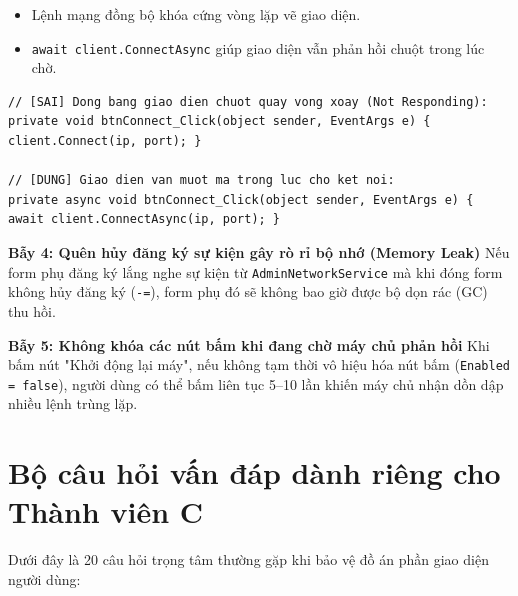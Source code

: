 \documentclass[12pt,a4paper]{article}
\begin{document}
\begin{orientationbox}
\begin{itemize}[leftmargin=1.5em, itemsep=1pt]
  \item Lệnh mạng đồng bộ khóa cứng vòng lặp vẽ giao diện.
  \item \texttt{await client.ConnectAsync} giúp giao diện vẫn phản hồi chuột trong lúc chờ.
\end{itemize}
\end{orientationbox}

\begin{lstlisting}[language=CSharp, caption={So sánh Bẫy 3: Blocking Connect vs Async Connect}]
// [SAI] Dong bang giao dien chuot quay vong xoay (Not Responding):
private void btnConnect_Click(object sender, EventArgs e) { client.Connect(ip, port); }

// [DUNG] Giao dien van muot ma trong luc cho ket noi:
private async void btnConnect_Click(object sender, EventArgs e) { await client.ConnectAsync(ip, port); }
\end{lstlisting}

\begin{pitfallbox}
\textbf{Bẫy 4: Quên hủy đăng ký sự kiện gây rò rỉ bộ nhớ (Memory Leak)}
\newline Nếu form phụ đăng ký lắng nghe sự kiện từ \texttt{AdminNetworkService} mà khi đóng form không hủy đăng ký (\texttt{-=}), form phụ đó sẽ không bao giờ được bộ dọn rác (GC) thu hồi.
\end{pitfallbox}

\begin{pitfallbox}
\textbf{Bẫy 5: Không khóa các nút bấm khi đang chờ máy chủ phản hồi}
\newline Khi bấm nút "Khởi động lại máy", nếu không tạm thời vô hiệu hóa nút bấm (\texttt{Enabled = false}), người dùng có thể bấm liên tục 5--10 lần khiến máy chủ nhận dồn dập nhiều lệnh trùng lặp.
\end{pitfallbox}

\section{Bộ câu hỏi vấn đáp dành riêng cho Thành viên C}

Dưới đây là 20 câu hỏi trọng tâm thường gặp khi bảo vệ đồ án phần giao diện người dùng:
\end{document}
